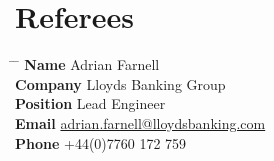 \documentclass[10pt]{article} %
\begin{document}

\section{Referees}

\parbox{0.5\textwidth}{ %
\begin{tabbing}
\hspace{2.75cm} \= \hspace{4cm} \= \kill %
{\bf Name} \> Adrian Farnell \\ %
{\bf Company} \> Lloyds Banking Group \\ %
{\bf Position} \> Lead Engineer \\ %
{\bf Email} \> \href{mailto:adrian.farnell@lloydsbanking.com}{adrian.farnell@lloydsbanking.com} \\ %
{\bf Phone} \> +44(0)7760 172 759 %
\end{tabbing}}
\hfill %

\end{document}
